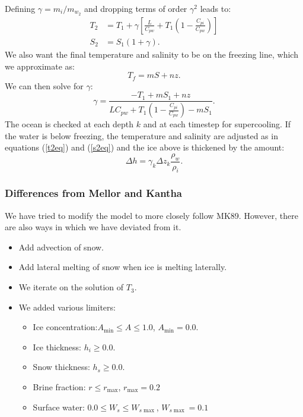 Defining $\gamma = m_i / m_{w_2}$ and dropping terms of order $\gamma^2$
leads to:
\begin{align}
   T_2 & = T_1 + \gamma \left[ \frac{L }{ C_{pw}} + T_1 \left( 1
   - \frac{C_{pi} }{ C_{pw}} \right) \right] \label{t2eq} \\
   S_2 & = S_1 (1 + \gamma) \label{s2eq} .
\end{align}
We also want the final temperature and salinity to be on the freezing
line, which we approximate as:
\begin{equation}
   T_f = m S + n z .
\end{equation}
We can then solve for $\gamma$:
\begin{equation}
   \gamma = \frac{-T_1 + mS_1 + nz }{ {L }{ C_{pw}}+ T_1 \left( 1
   - \frac{C_{pi} }{ C_{pw}} \right) - mS_1} .
\end{equation}
The ocean is checked at each depth $k$ and at each timestep for
supercooling.  If the water is below freezing, the temperature and
salinity are adjusted as in equations (\ref{t2eq}) and (\ref{s2eq})
and the ice above is thickened by the amount:
\begin{equation}
   \Delta h = \gamma_k \Delta z_k \frac{\rho_w}{\rho_i} .
\end{equation}

\subsubsection{Differences from Mellor and Kantha}
We have tried to modify the  model to more closely follow
MK89. However, there are also ways in which we have deviated from it.
\begin{itemize}
  \item Add advection of snow.
  \item Add lateral melting of snow when ice is melting laterally.
  \item We iterate on the solution of $T_3$.
  \item We added various limiters:
    \begin{itemize}
      \item Ice concentration:$A_{\min} \leq A \leq 1.0$, $A_{\min} = 0.0$.
      \item Ice thickness: $h_i \geq 0.0$.
      \item Snow thickness: $h_s \geq 0.0$.
      \item Brine fraction: $r \leq r_{\max}$, $r_{\max} = 0.2$
     \item Surface water: $0.0 \leq W_s \leq W_{s\max}$, $W_{s\max} = 0.1$
    \end{itemize}
\end{itemize}
